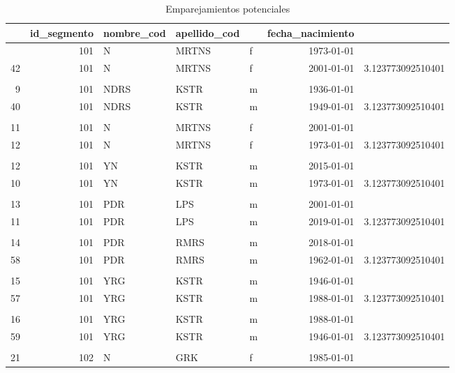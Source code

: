 \documentclass[
  12pt,
]{book}
\begin{document}
\begin{table}[t]
\caption*{
{\large Emparejamientos potenciales}
} 
\fontsize{12.0pt}{14.4pt}\selectfont
\begin{tabular*}{1\linewidth}{@{\extracolsep{\fill}}rrlllrr}
\toprule
{\bfseries \cellcolor[HTML]{F9F9F9}{id}} & id\_segmento & nombre\_cod & apellido\_cod & {\bfseries \cellcolor[HTML]{F9F9F9}{sexo}} & fecha\_nacimiento & {\bfseries \cellcolor[HTML]{F9F9F9}{Weight}} \\ 
\midrule\addlinespace[2.5pt]
 6 & 101 & N & MRTNS & f & 1973-01-01 &  \\ 
42 & 101 & N & MRTNS & f & 2001-01-01 & 3.123773092510401 \\ 
 &  &  &  &  &  &  \\ 
 9 & 101 & NDRS & KSTR & m & 1936-01-01 &  \\ 
40 & 101 & NDRS & KSTR & m & 1949-01-01 & 3.123773092510401 \\ 
 &  &  &  &  &  &  \\ 
11 & 101 & N & MRTNS & f & 2001-01-01 &  \\ 
12 & 101 & N & MRTNS & f & 1973-01-01 & 3.123773092510401 \\ 
 &  &  &  &  &  &  \\ 
12 & 101 & YN & KSTR & m & 2015-01-01 &  \\ 
10 & 101 & YN & KSTR & m & 1973-01-01 & 3.123773092510401 \\ 
 &  &  &  &  &  &  \\ 
13 & 101 & PDR & LPS & m & 2001-01-01 &  \\ 
11 & 101 & PDR & LPS & m & 2019-01-01 & 3.123773092510401 \\ 
 &  &  &  &  &  &  \\ 
14 & 101 & PDR & RMRS & m & 2018-01-01 &  \\ 
58 & 101 & PDR & RMRS & m & 1962-01-01 & 3.123773092510401 \\ 
 &  &  &  &  &  &  \\ 
15 & 101 & YRG & KSTR & m & 1946-01-01 &  \\ 
57 & 101 & YRG & KSTR & m & 1988-01-01 & 3.123773092510401 \\ 
 &  &  &  &  &  &  \\ 
16 & 101 & YRG & KSTR & m & 1988-01-01 &  \\ 
59 & 101 & YRG & KSTR & m & 1946-01-01 & 3.123773092510401 \\ 
 &  &  &  &  &  &  \\ 
21 & 102 & N & GRK & f & 1985-01-01 &  \\ 

\end{tabular*}
\end{table}
\end{document}
